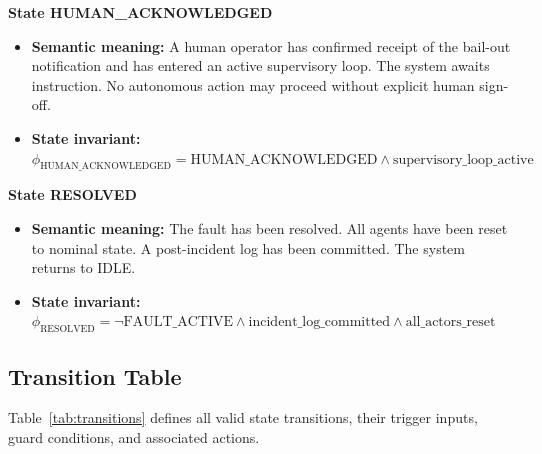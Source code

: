 \noindent\textbf{State HUMAN\_ACKNOWLEDGED}

\begin{itemize}
  \item \textbf{Semantic meaning:} A human operator has confirmed receipt of the bail-out notification and has entered an active supervisory loop. The system awaits instruction. No autonomous action may proceed without explicit human sign-off.
  \item \textbf{State invariant:} $\phi_{\text{HUMAN\_ACKNOWLEDGED}} = \text{HUMAN\_ACKNOWLEDGED} \land \text{supervisory\_loop\_active}$
\end{itemize}

\noindent\textbf{State RESOLVED}

\begin{itemize}
  \item \textbf{Semantic meaning:} The fault has been resolved. All agents have been reset to nominal state. A post-incident log has been committed. The system returns to IDLE.
  \item \textbf{State invariant:} $\phi_{\text{RESOLVED}} = \lnot \text{FAULT\_ACTIVE} \land \text{incident\_log\_committed} \land \text{all\_actors\_reset}$
\end{itemize}

\subsection{Transition Table}

Table~\ref{tab:transitions} defines all valid state transitions, their trigger inputs, guard conditions, and associated actions.

